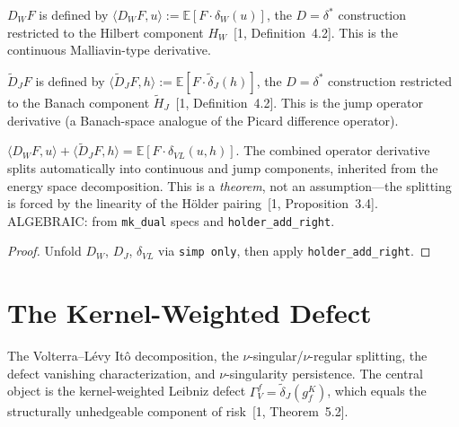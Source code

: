 \begin{defn}\label{def:D_W}
\leanok
{}
$D_W F$ is defined by $\langle D_W F, u \rangle := \mathbb{E}[F \cdot \delta_W(u)]$, the $D = \delta^*$ construction restricted to the Hilbert component $H_W$~[1, Definition~4.2]. This is the continuous Malliavin-type derivative.
\end{defn}

\begin{defn}\label{def:D_J}
\leanok
{}
$\tilde{D}_J F$ is defined by $\langle \tilde{D}_J F, h \rangle := \mathbb{E}[F \cdot \tilde{\delta}_J(h)]$, the $D = \delta^*$ construction restricted to the Banach component $\tilde{H}_J$~[1, Definition~4.2]. This is the jump operator derivative (a Banach-space analogue of the Picard difference operator).
\end{defn}

\begin{theorem}\label{thm:D_VL_split}
\leanok
{}
$\langle D_W F, u \rangle + \langle \tilde{D}_J F, h \rangle = \mathbb{E}[F \cdot \delta_{VL}(u,h)]$. The combined operator derivative splits automatically into continuous and jump components, inherited from the energy space decomposition. This is a \emph{theorem}, not an assumption---the splitting is forced by the linearity of the H\"older pairing~[1, Proposition~3.4]. ALGEBRAIC: from \texttt{mk\_dual} specs and \texttt{holder\_add\_right}.
\end{theorem}
\begin{proof}\leanok Unfold $D_W$, $D_J$, $\delta_{VL}$ via \texttt{simp only}, then apply \texttt{holder\_add\_right}.\end{proof}


\chapter{The Kernel-Weighted Defect}

The Volterra--L\'evy It\^o decomposition, the $\nu$-singular/$\nu$-regular splitting, the defect vanishing characterization, and $\nu$-singularity persistence. The central object is the kernel-weighted Leibniz defect $\Gamma_V^f = \tilde{\delta}_J(g_f^K)$, which equals the structurally unhedgeable component of risk~[1, Theorem~5.2].


